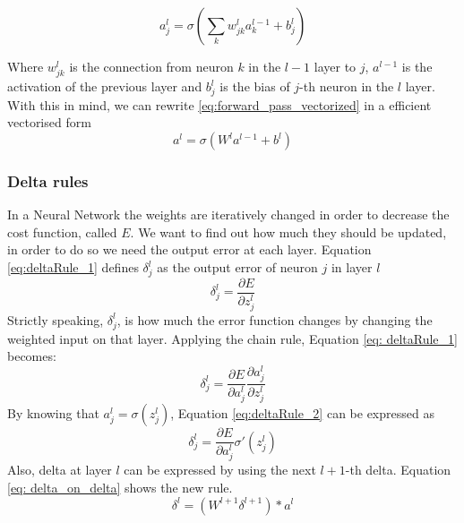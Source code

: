 \documentclass[11pt]{article}
\begin{document}
\begin{equation}
\label{eq:forward_pass}
a^l_j = \sigma(\sum_k w^l_{jk}a^{l-1}_k + b^l_j)
\end{equation}

Where $w^l_{jk}$ is the connection from neuron $k$ in the $l-1$ layer to $j$, $a^{l-1}$ is the activation of the previous layer and $b^l_j$ is the bias of $j$-th neuron in the $l$ layer. With this in mind, we can rewrite \ref{eq:forward_pass_vectorized} in a efficient vectorised form
\begin{equation}
\label{eq:forward_pass_vectorized}
a^l = \sigma(W^la^{l-1} + b^l)
\end{equation}

\subsubsection{Delta rules}
In a Neural Network the weights are iteratively changed in order to decrease the cost function, called $E$. We want to find out how much they should be updated, in order to do so we need the output error at each layer. Equation \ref{eq:deltaRule_1} defines $\delta^l_j$ as the output error of neuron $j$ in layer $l$
\begin{equation}
	\delta^l_j = \frac{\partial E}{\partial z^l_j}
	\label{eq: deltaRule_1}
\end{equation}
Strictly speaking, $\delta^l_j$, is how much the error function changes by changing the weighted input on that layer. Applying the chain rule, Equation \ref{eq: deltaRule_1} becomes:
\begin{equation}
\delta^l_j = \frac{\partial E}{\partial a^l_j} \frac{\partial a^l_j}{\partial z^l_j}
\label{eq:deltaRule_2}
\end{equation}
By knowing that $a^l_j = \sigma(z^l_j)$, Equation \ref{eq:deltaRule_2} can be expressed as
\begin{equation}
\delta^l_j = \frac{\partial E}{\partial a^l_j} \sigma'(z^l_j)
\label{eq:deltaRule}	
\end{equation}
Also, delta at layer $l$ can be expressed by using the next $l+1$-th delta. Equation \ref{eq: delta_on_delta} shows the new rule.
\begin{equation}
\delta^l = (W^{l+1}\delta^{l+1}) * a^l
\label{eq: delta_on_delta}
\end{equation}
\end{document}
